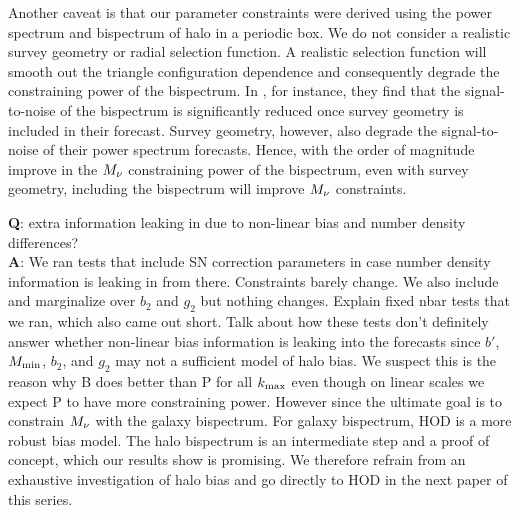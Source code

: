 Another caveat is that our parameter constraints were derived using the power 
spectrum and bispectrum of halo in a periodic box. We do not consider a 
realistic survey geometry or radial selection function. A realistic selection 
function will smooth out the triangle configuration dependence and consequently 
degrade the constraining power of the bispectrum. In \cite{sefusatti2005}, for 
instance, they find that the signal-to-noise of the bispectrum is significantly 
reduced once survey geometry is included in their forecast. Survey geometry, 
however, also degrade the signal-to-noise of their power spectrum forecasts. 
Hence, with the order of magnitude improve in the $M_\nu$ constraining power 
of the bispectrum, even with survey geometry, including the bispectrum will 
improve $M_\nu$ constraints. 

{\bf Q}: extra information leaking in due to non-linear bias and number density differences? \\
{\bf A}: We ran tests that include SN correction parameters in case number density 
information is leaking in from there. Constraints barely change. We also include and marginalize 
over $b_2$ and $g_2$ but nothing changes. Explain fixed nbar tests that we ran, which also came 
out short. Talk about how these tests don't definitely answer whether non-linear bias information
is leaking into the forecasts since $b'$, $M_{\rm min}$, $b_2$, and $g_2$ may not a sufficient
model of halo bias. We suspect this is the reason why B does better than P for all $k_{\rm max}$ 
even though on linear scales we expect P to have more constraining power. 
However since the ultimate goal is to constrain $M_\nu$ with the galaxy 
bispectrum.  For galaxy bispectrum, HOD is a more robust bias model. The halo bispectrum is an
intermediate step and a proof of concept, which our results show is promising. We therefore 
refrain from an exhaustive investigation of halo bias and go directly to HOD in the next paper 
of this series.


